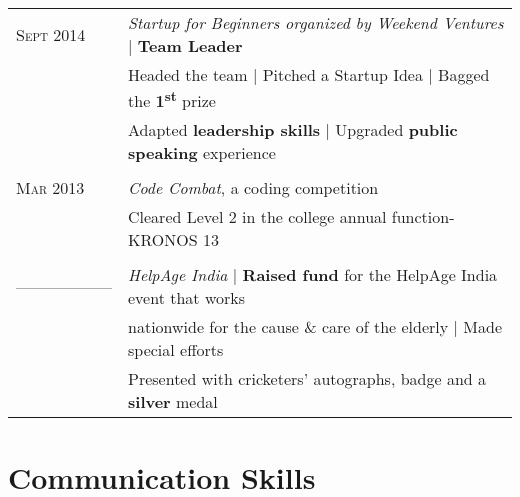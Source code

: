 \documentclass[a4paper,10pt]{article} %
\begin{document}
\begin{tabular}{ll}
\textsc{Sept} 2014 & \emph{Startup for Beginners organized by Weekend Ventures} | \textbf{Team Leader}\\
& Headed the team | Pitched a Startup Idea | Bagged the \textbf{1\textsuperscript{st}} prize\\
& Adapted \textbf{leadership skills} | Upgraded \textbf{public speaking} experience\\
&\\


\textsc{Mar} 2013 & \emph{Code Combat}, a coding competition\\
& Cleared Level 2 in the college annual function- KRONOS 13\\
&\\


\textsc{------------------} & \emph{HelpAge India} | \textbf{Raised fund} for the HelpAge India event that works\\
& nationwide for the cause \& care of the elderly | Made special efforts\\
& Presented with cricketers' autographs, badge and a \textbf{silver} medal
\end{tabular}


\section{Communication Skills}
\end{document}

